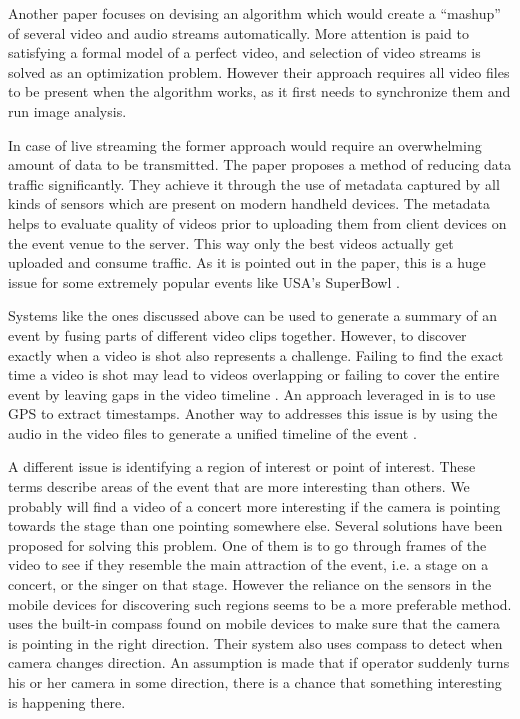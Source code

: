 \documentclass[conference]{IEEEtran}
\begin{document}
Another paper \cite{shrestha_automatic_2010} focuses on devising an algorithm which would create 
a ``mashup'' of several video and audio streams automatically.
More attention is paid to satisfying a formal model of a perfect video, 
and selection of video streams is solved as an optimization problem.
However their approach requires all video files to be present when the algorithm works, 
as it first needs to synchronize them and run image analysis.

In case of live streaming the former approach would require an overwhelming amount of data to be transmitted.
The paper \cite{seshadri_demand_2014} proposes a method of reducing data traffic significantly.
They achieve it through the use of metadata captured by all kinds of sensors which are present on modern handheld devices.
The metadata helps to evaluate quality of videos prior to uploading them from client devices on the event venue to the server.
This way only the best videos actually get uploaded and consume traffic.
As it is pointed out in the paper, this is a huge issue for some extremely popular events like USA's SuperBowl \cite{Erman:2013}.

Systems like the ones discussed above can be used to generate a summary of an event by fusing parts of different video clips together.
However, to discover exactly when a video is shot also represents a challenge. 
Failing to find the exact time a video is shot may lead to videos overlapping or failing to cover the entire event 
by leaving gaps in the video timeline \cite{shrestha_automatic_2010}. 
An approach leveraged in \cite{jain_focus:_2013} is to use GPS to extract timestamps. 
Another way to addresses this issue is by using the audio in the video files 
to generate a unified timeline of the event \cite{shrestha_automatic_2010}. 

A different issue is identifying a region of interest or point of interest.
These terms describe areas of the event that are more interesting than others. 
We probably will find a video of a concert more interesting if the camera is pointing towards the stage than one pointing somewhere else.
Several solutions have been proposed for solving this problem.
One of them is to go through frames of the video to see if they resemble the main attraction of the event, 
i.e. a stage on a concert, or the singer on that stage. 
However the reliance on the sensors in the mobile devices for discovering such regions seems to be a more preferable method.
\cite{cricri_sensor-based_2012} uses the built-in compass found on mobile devices to make sure 
that the camera is pointing in the right direction.
Their system also uses compass to detect when camera changes direction. 
An assumption is made that if operator suddenly turns his or her camera in some direction,
there is a chance that something interesting is happening there.
\end{document}
